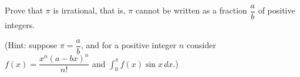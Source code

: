 Prove that $\pi$ is irrational, that is, $\pi$ cannot be written as a fraction $\dfrac ab$ of positive integers.

(Hint: suppose $\pi=\dfrac ab$, and for a positive integer $n$ consider $f(x)=\dfrac{x^n(a-bx)^n}{n!}$ and $\displaystyle\int_0^\pi f(x)\sin x\,dx$.)
